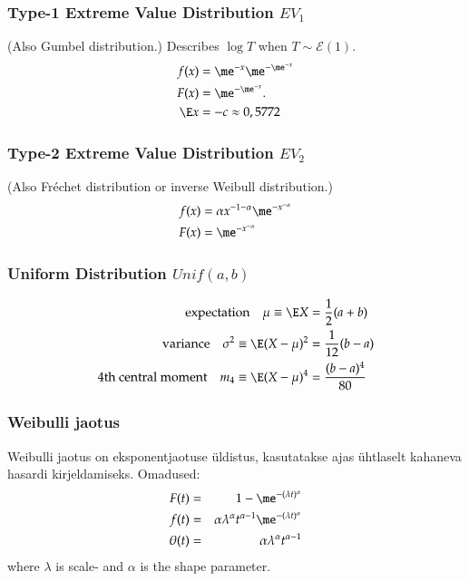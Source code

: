 \documentclass[a4paper]{article}
\numberwithin{equation}{subsection}
\begin{document}
\subsubsection{Type-1 Extreme Value Distribution $EV_{1}$}
(Also Gumbel distribution.)
Describes $\log T$ when $T \sim \mathcal{E}(1)$.
\begin{align}
f(x) &= \me^{-x} \me^{-\me^{-x}}
\\
F(x) &=  \me^{-\me^{-x}}.
\\
\E x &= -c \approx 0,5772
\end{align}

\subsubsection{Type-2 Extreme Value Distribution $EV_{2}$}
(Also Fréchet distribution or inverse Weibull distribution.)
\begin{align}
  f(x) &= \alpha x^{-1-\alpha} \me^{-x^{-\alpha}}
  \\
  F(x) &= \me^{-x^{-\alpha}}
\end{align}


\subsubsection{Uniform Distribution $Unif(a,b)$}
\begin{align}
  \text{expectation}\quad
  \mu \equiv \E X &= \frac{1}{2}(a + b)
  \\
  \text{variance}\quad
  \sigma^{2} \equiv \E (X - \mu)^{2} & = \frac{1}{12}(b - a)
  \\
  \text{4th central moment}\quad
  m_{4} \equiv \E (X - \mu)^{4} &= \frac{(b - a)^{4}}{80}
\end{align}

\subsubsection{Weibulli jaotus}
Weibulli jaotus on eksponentjaotuse üldistus, kasutatakse ajas
ühtlaselt kahaneva hasardi kirjeldamiseks.  Omadused:
\begin{eqnarray}
  F(t) &=& 1 - \me^{-(\lambda t)^\alpha}
  \\
  f(t) &=& \alpha \lambda^\alpha t^{\alpha - 1}
  \me^{-(\lambda t)^\alpha}\\
  \theta(t) &=& \alpha \lambda^\alpha t^{\alpha - 1}
\end{eqnarray}
where $\lambda$ is scale- and $\alpha$ is the shape parameter.
\end{document}
